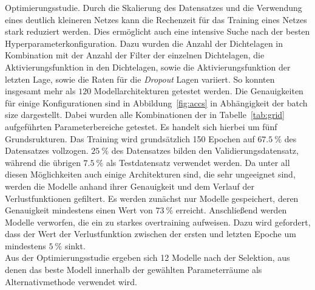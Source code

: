 Optimierungsstudie. Durch die Skalierung des Datensatzes und die Verwendung
eines deutlich kleineren Netzes kann die Rechenzeit für das Training eines
Netzes stark reduziert werden. Dies ermöglicht auch eine intensive Suche nach
der besten Hyperparameterkonfiguration. Dazu wurden die Anzahl der Dichtelagen
in Kombination mit der Anzahl der Filter der einzelnen Dichtelagen, die
Aktivierungsfunktion in den Dichtelagen, sowie die Aktivierungsfunktion der
letzten Lage, sowie die Raten für die \textit{Dropout} Lagen variiert. So
konnten insgesamt mehr als $120$ Modellarchitekturen getestet werden. Die
Genauigkeiten für einige Konfigurationen sind in Abbildung~\ref{fig:accs} in 
Abhängigkeit der batch size dargestellt.
Dabei wurden alle Kombinationen der in Tabelle~\ref{tab:grid} aufgeführten
Parameterbereiche getestet. Es handelt sich hierbei um fünf Grundsrukturen.
Das Training wird grundsätzlich 150 Epochen auf $\SI{67.5}{\percent}$ des
Datensatzes vollzogen. $\SI{25}{\percent}$ des Datensatzes bilden den
Validierungsdatensatz, während die übrigen $\SI{7.5}{\percent}$ als
Testdatensatz verwendet werden.
Da unter all diesen Möglichkeiten auch einige Architekturen sind, die sehr
ungeeignet sind, werden die Modelle anhand ihrer Genauigkeit und dem Verlauf
der Verlustfunktionen gefiltert. Es werden zunächst nur Modelle gespeichert,
deren Genauigkeit mindestens einen Wert von $\SI{73}{\percent}$ erreicht.
Anschließend werden Modelle verworfen, die ein zu starkes overtraining
aufweisen. Dazu wird gefordert, dass der Wert der Verlustfunktion zwischen der
ersten und letzten Epoche um mindestens $\SI{5}{\percent}$ sinkt.\\
Aus der Optimierungsstudie ergeben sich 12 Modelle nach der Selektion, aus
denen das beste Modell innerhalb der gewählten Parameterräume als
Alternativmethode verwendet wird.\\

